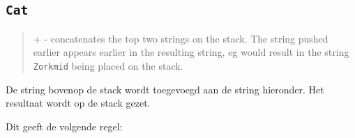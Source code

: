 \subsection{\texttt{Cat}}
\label{sec:rules:cat}

\begin{quote}
    + - concatenates the top two strings on the stack. The string pushed earlier
		appears earlier in the resulting string, eg 
		would result in the string \texttt{Zorkmid} being placed on the stack.
\end{quote}

De string bovenop de stack wordt toegevoegd aan de string hieronder. Het
resultaat wordt op de stack gezet.

Dit geeft de volgende regel:
\thercatns
